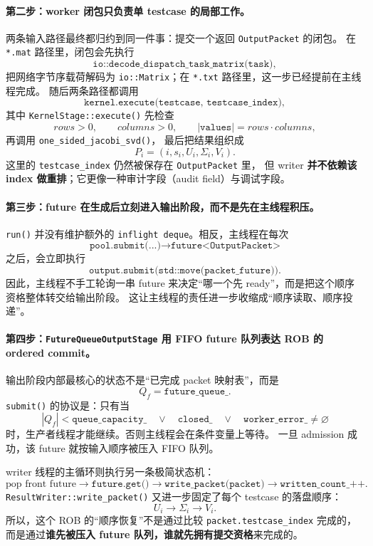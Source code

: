 \paragraph{第二步：worker 闭包只负责单 testcase 的局部工作。}
两条输入路径最终都归约到同一件事：提交一个返回 \texttt{OutputPacket} 的闭包。
在 \texttt{*.mat} 路径里，闭包会先执行
\[
    \texttt{io::decode\_dispatch\_task\_matrix(task)},
\]
把网络字节序载荷解码为 \texttt{io::Matrix}；在 \texttt{*.txt} 路径里，这一步已经提前在主线程完成。
随后两条路径都调用
\[
    \texttt{kernel.execute(testcase, testcase\_index)},
\]
其中 \texttt{KernelStage::execute()} 先检查
\[
    rows>0,\qquad columns>0,\qquad |\texttt{values}|=rows\cdot columns,
\]
再调用 \texttt{one\_sided\_jacobi\_svd()}，
最后把结果组织成
\[
    P_i=(i,s_i,U_i,\Sigma_i,V_i).
\]
这里的 \texttt{testcase\_index} 仍然被保存在 \texttt{OutputPacket} 里，
但 writer \textbf{并不依赖该 index 做重排}；它更像一种审计字段（audit field）与调试字段。

\paragraph{第三步：future 在生成后立刻进入输出阶段，而不是先在主线程积压。}
\texttt{run()} 并没有维护额外的
\texttt{inflight deque}。相反，主线程在每次
\[
    \texttt{pool.submit(...)} \longrightarrow \texttt{future<OutputPacket>}
\]
之后，会立即执行
\[
    \texttt{output.submit(std::move(packet\_future))}.
\]
因此，主线程不手工轮询一串 future 来决定“哪一个先 ready”，而是把这个顺序资格整体转交给输出阶段。
这让主线程的责任进一步收缩成“顺序读取、顺序投递”。

\paragraph{第四步：\texttt{FutureQueueOutputStage} 用 FIFO future 队列表达 ROB 的 ordered commit。}
输出阶段内部最核心的状态不是“已完成 packet 映射表”，而是
\[
    Q_f=\texttt{future\_queue\_}.
\]
\texttt{submit()} 的协议是：只有当
\[
    |Q_f|<\texttt{queue\_capacity\_}
    \quad\lor\quad
    \texttt{closed\_}
    \quad\lor\quad
    \texttt{worker\_error\_}\neq\varnothing
\]
时，生产者线程才能继续。否则主线程会在条件变量上等待。
一旦 admission 成功，该 future 就按输入顺序被压入 FIFO 队列。

writer 线程的主循环则执行另一条极简状态机：
\[
    \text{pop front future}
    \longrightarrow
    \texttt{future.get()}
    \longrightarrow
    \texttt{write\_packet(packet)}
    \longrightarrow
    \texttt{written\_count\_++}.
\]
\texttt{ResultWriter::write\_packet()} 又进一步固定了每个 testcase 的落盘顺序：
\[
    U_i \longrightarrow \Sigma_i \longrightarrow V_i.
\]
所以，这个 ROB 的“顺序恢复”不是通过比较 \texttt{packet.testcase\_index} 完成的，
而是通过\textbf{谁先被压入 future 队列，谁就先拥有提交资格}来完成的。

